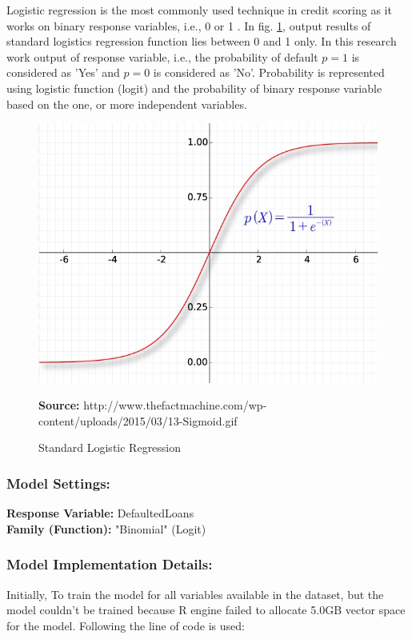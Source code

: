 Logistic regression is the most commonly used technique in credit scoring as it works on binary response variables, i.e., 0 or 1 \citep{hilbe2011logistic}. In fig. \ref{fig:logistic}, output results of standard logistics regression function lies between 0 and 1 only. In this research work output of response variable, i.e., the probability of default $p=1$ is considered as 'Yes' and $p=0$ is considered as 'No'. Probability is represented using logistic function (logit) and the probability of binary response variable based on the one, or more independent variables.

\begin{center}
\begin{figure}[!htb]
\includegraphics[width=\textwidth]{logistic.jpg}
\centering
\caption{Standard Logistic Regression}{\textbf{Source:} http://www.thefactmachine.com/wp-content/uploads/2015/03/13-Sigmoid.gif}
\label{fig:logistic}
\end{figure}
\end{center}

\subsubsection*{Model Settings:}
\textbf{Response Variable:} DefaultedLoans\\
\textbf{Family (Function):} "Binomial" (Logit)

\subsubsection*{Model Implementation Details:}
Initially, To train the model for all variables available in the dataset, but the model couldn't be trained because R engine failed to allocate 5.0GB vector space for the model. Following the line of code is used:

